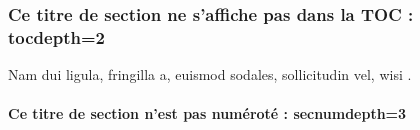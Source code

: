 \subsubsection{Ce titre de section ne s'affiche pas dans la TOC : tocdepth=2}
Nam dui ligula, fringilla a, euismod sodales, sollicitudin vel, wisi \parencite{zohdy_mapping_2012}. \lipsum[3] %
\paragraph{Ce titre de section n'est pas numéroté : secnumdepth=3}~~\\ %

\lipsum[3]
